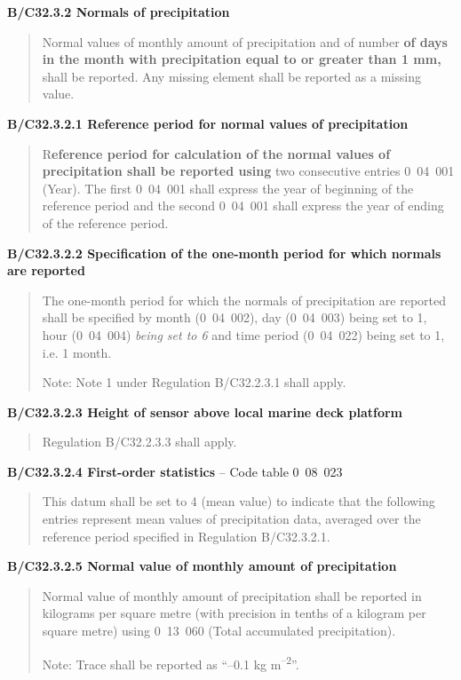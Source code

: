 \textbf{B/C32.3.2 Normals of precipitation}

\begin{quote}
Normal values of monthly amount of precipitation and of number \textbf{of days in the month with precipitation equal to or greater than 1 mm,} shall be reported. Any missing element shall be reported as a missing value.
\end{quote}

\textbf{B/C32.3.2.1 Reference period for normal values of precipitation}

\begin{quote}
R\textbf{eference period for calculation of the normal values of precipitation shall be reported using} two consecutive entries 0~04~001 (Year). The first 0~04~001 shall express the year of beginning of the reference period and the second 0~04~001 shall express the year of ending of the reference period.
\end{quote}

\textbf{B/C32.3.2.2 Specification of the one-month period for which normals are reported}

\begin{quote}
The one-month period for which the normals of precipitation are reported shall be specified by month (0~04~002), day (0~04~003) being set to 1, hour (0~04~004) \emph{being set to 6} and time period (0~04~022) being set to 1, i.e. 1 month.

Note: Note 1 under Regulation B/C32.2.3.1 shall apply.
\end{quote}

\textbf{B/C32.3.2.3 Height of sensor above local marine deck platform}

\begin{quote}
Regulation B/C32.2.3.3 shall apply.
\end{quote}

\textbf{B/C32.3.2.4 First-order statistics} -- Code table 0~08~023

\begin{quote}
This datum shall be set to 4 (mean value) to indicate that the following entries represent mean values of precipitation data, averaged over the reference period specified in Regulation B/C32.3.2.1.
\end{quote}

\textbf{B/C32.3.2.5 Normal value of monthly amount of precipitation}

\begin{quote}
Normal value of monthly amount of precipitation shall be reported in kilograms per square metre (with precision in tenths of a kilogram per square metre) using 0~13~060 (Total accumulated precipitation).

Note: Trace shall be reported as ``--0.1 kg m\textsuperscript{--2}''.
\end{quote}

